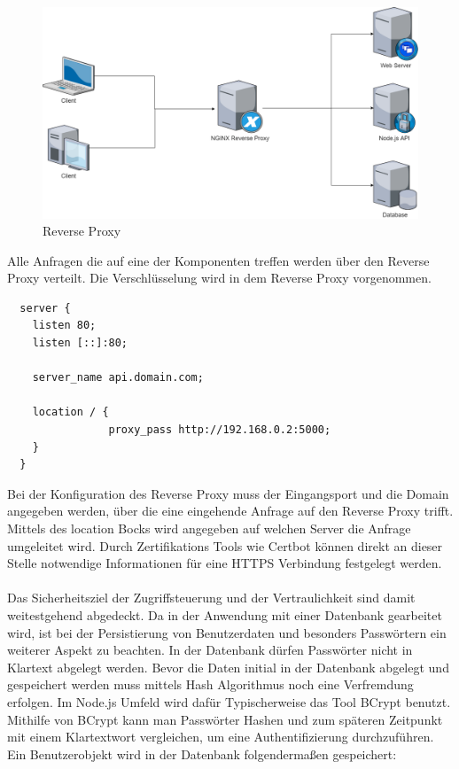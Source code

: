 \documentclass[utf8,biblatex]{lni}
\begin{document}
\begin{figure}
  \centering
  \includegraphics[width=\textwidth]{images/reversep.png}
  \caption[Reverse Proxy]{Reverse Proxy} 
  \label{Reverse-proxy}
\end{figure} 

Alle Anfragen die auf eine der Komponenten treffen werden über den Reverse Proxy verteilt. Die Verschlüsselung wird 
in dem Reverse Proxy vorgenommen. 

\begin{verbatim}
  server {
    listen 80;
    listen [::]:80;

    server_name api.domain.com;

    location / {
                proxy_pass http://192.168.0.2:5000;
    }
  }
\end{verbatim}

Bei der Konfiguration des Reverse Proxy muss der Eingangsport und die Domain angegeben werden, über die eine eingehende Anfrage auf den Reverse Proxy trifft. 
Mittels des \glqq location\grqq{}  Bocks wird angegeben auf welchen Server die Anfrage umgeleitet wird. 
Durch Zertifikations Tools wie Certbot können direkt an dieser Stelle notwendige Informationen für eine HTTPS Verbindung festgelegt werden. 
\\\\
Das Sicherheitsziel der Zugriffsteuerung und der Vertraulichkeit sind damit weitestgehend abgedeckt. 
Da in der Anwendung mit einer Datenbank gearbeitet wird, ist bei der Persistierung von Benutzerdaten und besonders Passwörtern ein weiterer Aspekt zu beachten. 
In der Datenbank dürfen Passwörter nicht in Klartext abgelegt werden. 
Bevor die Daten initial in der Datenbank abgelegt und gespeichert werden muss mittels Hash Algorithmus noch eine Verfremdung erfolgen. 
Im Node.js Umfeld wird dafür Typischerweise das Tool \glqq BCrypt\grqq{}  benutzt. Mithilfe von BCrypt kann man Passwörter Hashen und zum späteren Zeitpunkt 
mit einem Klartextwort vergleichen, um eine Authentifizierung durchzuführen. 
Ein Benutzerobjekt wird in der Datenbank folgendermaßen gespeichert: 
\end{document}
